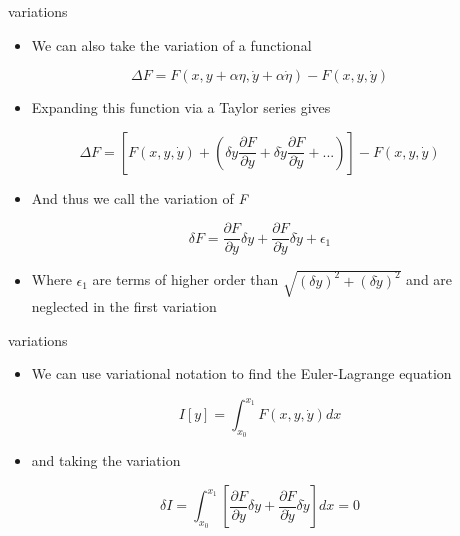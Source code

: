 \documentclass[12pt,handout]{beamer}
\providecommand{\tightlist}{%
  \setlength{\itemsep}{0pt}\setlength{\parskip}{0pt}}
\providecommand{\tightlist}{%
\setlength{\itemsep}{0pt}\setlength{\parskip}{0pt}}
\begin{document}
\begin{frame}{variations}
\protect\hypertarget{variations-3}{}
\begin{itemize}
\tightlist
\item
  We can also take the variation of a functional
\end{itemize}

\[\Delta F = F(x,y + \alpha \eta, \dot{y} + \alpha \dot{\eta}) - F(x,y,\dot{y})\]

\begin{itemize}
\tightlist
\item
  Expanding this function via a Taylor series gives
\end{itemize}

\[\Delta F = \left [ F(x,y,\dot{y}) + \left( \delta y \frac{\partial F}{\partial y} + \delta \dot{y} \frac{\partial F}{\partial \dot{y}} + ... \right) \right]- F(x,y,\dot{y})\]

\begin{itemize}
\tightlist
\item
  And thus we call the variation of \emph{F}
\end{itemize}

\[\delta F = \frac{\partial F}{\partial y} \delta y + \frac{\partial F}{\partial \dot{y}} \delta \dot{y} + \epsilon_1\]

\begin{itemize}
\tightlist
\item
  Where \(\epsilon_1\) are terms of higher order than
  \(\sqrt{(\delta y)^2 + (\delta \dot{y})^2}\) and are neglected in the
  first variation
\end{itemize}
\end{frame}

\begin{frame}{variations}
\protect\hypertarget{variations-4}{}
\begin{itemize}
\tightlist
\item
  We can use variational notation to find the Euler-Lagrange equation
\end{itemize}

\[I[y] = \int_{x_0}^{x_1} F(x,y,\dot{y})dx\]

\begin{itemize}
\tightlist
\item
  and taking the variation
\end{itemize}

\[\delta I = \int_{x_0}^{x_1} \left[  \frac{\partial F}{\partial y} \delta y + \frac{\partial F}{\partial \dot{y}} \delta \dot{y}\right]dx = 0\]
\end{frame}
\end{document}
